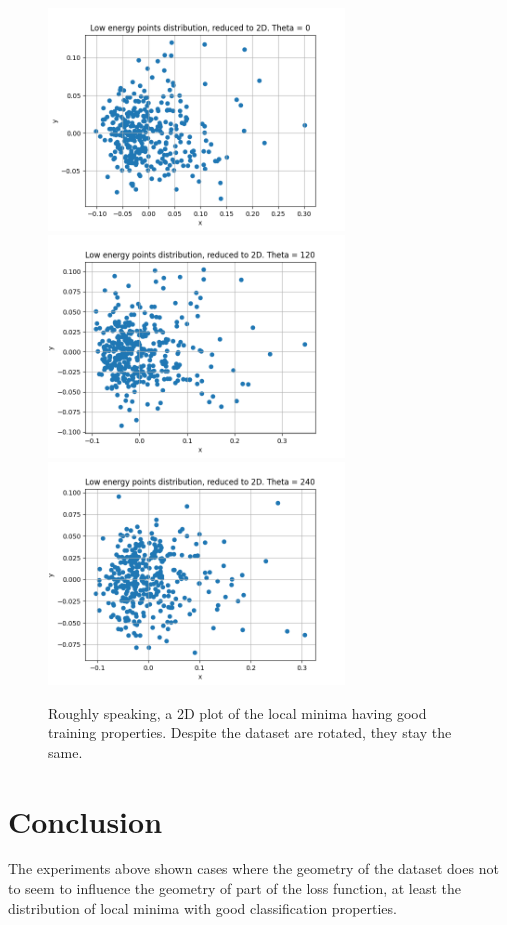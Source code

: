 \documentclass{article}
\begin{document}
\begin{figure}
\includegraphics[width=0.7\textwidth]{../theta0/reduction2D.png}
\includegraphics[width=0.7\textwidth]{../theta120/reduction2D.png}
\includegraphics[width=0.7\textwidth]{../theta240/reduction2D.png}
	\caption{Roughly speaking, a 2D plot of the
	local minima having good training properties.
	Despite	the dataset are rotated, they stay the same.}
\end{figure}

\section{Conclusion}
The experiments above shown cases where the geometry of the dataset
does not to seem to influence the geometry of part of the loss function,
at least the distribution of local minima with good classification
properties. 
\end{document}
